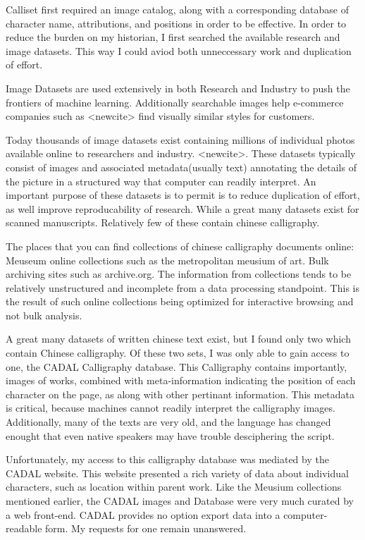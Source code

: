 
Calliset first required an image catalog, along with a corresponding database of character name, attributions, and positions in order to be effective.  In order to reduce the burden on my historian, I first searched the available research and image datasets.  This way I could aviod both unneccessary work and duplication of effort.



Image Datasets are used extensively in both Research and Industry to push the frontiers of machine learning.  Additionally searchable images help e-commerce companies such as <newcite> find visually similar styles for customers.

Today thousands of image datasets exist containing millions of individual photos available online to researchers and industry.  <newcite>.  These datasets typically consist of images and associated metadata(usually text) annotating the details of the picture in a structured way that computer can readily interpret.  An important purpose of these datasets is to permit is to reduce duplication of effort, as well improve reproducability of research.  While a great many datasets exist for scanned manuscripts.  Relatively few of these contain chinese calligraphy.

The places that you can find collections of chinese calligraphy documents online:  Meuseum online collections such as the metropolitan meusium of art.  Bulk archiving sites such as archive.org.  The information from collections tends to be relatively unstructured and incomplete from a data processing standpoint.  This is the result of such online collections being optimized for interactive browsing and not bulk analysis.

A great many datasets of written chinese text exist, but I found only two which contain Chinese calligraphy.  Of these two sets, I was only able to gain access to one, the CADAL Calligraphy database.  This Calligraphy contains importantly, images of works, combined with meta-information indicating the position of each character on the page, as along with other pertinant information.  This metadata is critical, because machines cannot readily interpret the calligraphy images.  Additionally, many of the texts are very old, and the language has changed enought that even native speakers may have trouble desciphering the script.

Unfortunately, my access to this calligraphy database was mediated by the CADAL website.  This website presented a rich variety of data about individual characters, such as location within parent work.  Like the Meusium collections mentioned earlier, the CADAL images and Database were very much curated by a web front-end.  CADAL provides no option export data into a computer-readable form.  My requests for one remain unanswered.


